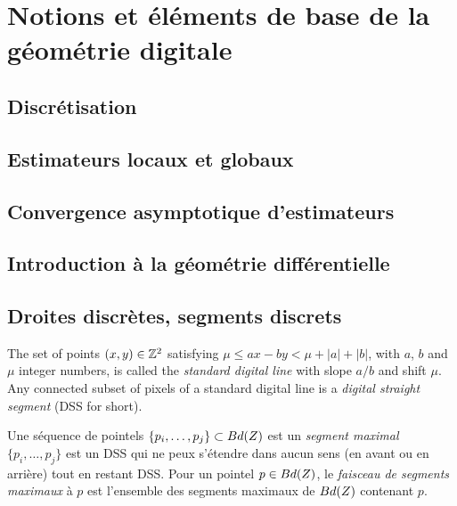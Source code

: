 %
\chapter{Notions et éléments de base de la géométrie digitale}
\label{sec:notions}


\setcounter{minitocdepth}{3}
\minitoc

\newpage

\section{Discrétisation}

\section{Estimateurs locaux et globaux}

\section{Convergence asymptotique d'estimateurs}

\section{Introduction à la géométrie différentielle}

\section{Droites discrètes, segments discrets}

\begin{definition}
  The set of points $(x,y)\in\mathbb{Z}^2$ satisfying $\mu \le ax - by < \mu +
  |a| + |b|$, with $a$, $b$ and $\mu$ integer numbers, is called the
  {\em standard digital line} with slope $a/b$ and shift $\mu$.  Any
  connected subset of pixels of a standard digital line is a
  \emph{digital straight segment} (DSS for short).
\end{definition}

\begin{definition}
  Une séquence de pointels $\{p_i,\ldots,p_j\}\subset Bd({Z})$ est un {\em
    segment maximal} \ssi $\{p_i,\ldots,p_j\}$ est un DSS qui ne peux s'étendre dans aucun sens (en avant ou en arrière) tout en restant DSS.
    Pour un pointel $p\in Bd({Z})$, le \emph{faisceau de segments maximaux} à $p$ est l'ensemble des segments maximaux de $Bd({Z})$ contenant $p$.
\end{definition}

